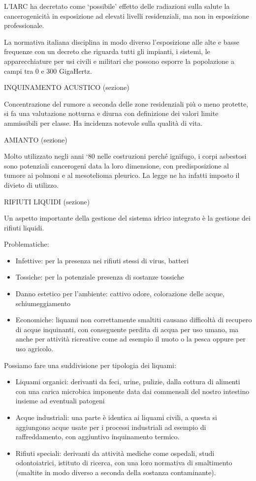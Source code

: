 \documentclass[]{article}
\begin{document}
L'IARC ha decretato come `possibile' effetto delle radiazioni sulla
salute la cancerogenicità in esposizione ad elevati livelli
residenziali, ma non in esposizione professionale.

La normativa italiana disciplina in modo diverso l'esposizione alle alte
e basse frequenze con un decreto che riguarda tutti gli impianti, i
sistemi, le apparecchiature per usi civili e militari che possono
esporre la popolazione a campi tra 0 e 300 GigaHertz.

INQUINAMENTO ACUSTICO (sezione)

Concentrazione del rumore a seconda delle zone residenziali più o meno
protette, si fa una valutazione notturna e diurna con definizione dei
valori limite ammissibili per classe. Ha incidenza notevole sulla
qualità di vita.

AMIANTO (sezione)

Molto utilizzato negli anni `80 nelle costruzioni perché ignifugo, i
corpi asbestosi sono potenziali cancerogeni data la loro dimensione, con
predisposizione al tumore ai polmoni e al mesotelioma pleurico. La legge
ne ha infatti imposto il divieto di utilizzo.

RIFIUTI LIQUIDI (sezione)

Un aspetto importante della gestione del sistema idrico integrato è la
gestione dei rifiuti liquidi.

Problematiche:

\begin{itemize}
\item
  Infettive: per la presenza nei rifiuti stessi di virus, batteri
\item
  Tossiche: per la potenziale presenza di sostanze tossiche
\item
  Danno estetico per l'ambiente: cattivo odore, colorazione delle acque,
  schiumeggiamento
\item
  Economiche: liquami non correttamente smaltiti causano difficoltà di
  recupero di acque inquinanti, con conseguente perdita di acqua per uso
  umano, ma anche per attività ricreative come ad esempio il nuoto o la
  pesca oppure per uso agricolo.
\end{itemize}

Possiamo fare una suddivisione per tipologia dei liquami:

\begin{itemize}
\item
  Liquami organici: derivanti da feci, urine, pulizie, dalla cottura di
  alimenti con una carica microbica imponente data dai commensali del
  nostro intestino insieme ad eventuali patogeni
\item
  Acque industriali: una parte è identica ai liquami civili, a questa si
  aggiungono acque usate per i processi industriali ad esempio di
  raffreddamento, con aggiuntivo inquinamento termico.
\item
  Rifiuti speciali: derivanti da attività mediche come ospedali, studi
  odontoiatrici, istituto di ricerca, con una loro normativa di
  smaltimento (smaltite in modo diverso a seconda della sostanza
  contaminante).
\end{itemize}
\end{document}
